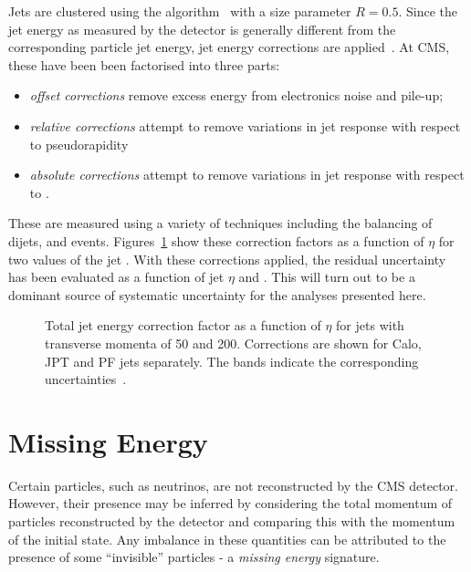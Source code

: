 Jets are clustered using the \antiKT algorithm~\cite{antiKT} with a size
parameter $R=0.5$. Since the jet energy as measured by the detector is generally
different from the corresponding particle jet energy, jet energy corrections are
applied~\cite{jet_energy_cms, jet_energy_pas}. At \ac{CMS}, these have been been
factorised into three parts:
\begin{itemize}
\item \emph{offset corrections} remove excess energy from electronics noise and
  pile-up;
\item \emph{relative corrections} attempt to remove variations in jet response
  with respect to pseudorapidity
\item \emph{absolute corrections} attempt to remove variations in jet response
  with respect to \Pt.
\end{itemize}
These are measured using a variety of techniques including the balancing of
dijets, \gammajets and \Zjets events. Figures~\ref{fig:reco_jet_energy_corr}
show these correction factors as a function of $\eta$ for two values of the jet
\Pt. With these corrections applied, the residual uncertainty has been evaluated
as a function of jet $\eta$ and \Pt. This will turn out to be a dominant source
of systematic uncertainty for the analyses presented here.

\begin{figure}
  \centering
  \quad
  \quad
  \caption[Total jet energy correction factor as a function of $\eta$ for jets
  with transverse momenta of \unit{50}{\GeV} and \unit{200}{\GeV}]{Total jet
    energy correction factor as a function of $\eta$ for jets with transverse
    momenta of \unit{50}{\GeV} and \unit{200}{\GeV}. Corrections are shown for
    \ac{Calo}, \ac{JPT} and \ac{PF} jets separately. The bands indicate the
    corresponding uncertainties~\cite{jet_energy_pas}.}
  \label{fig:reco_jet_energy_corr}
\end{figure}

\section{Missing Energy}
Certain particles, such as neutrinos, are not reconstructed by the \ac{CMS}
detector. However, their presence may be inferred by considering the total
momentum of particles reconstructed by the detector and comparing this with the
momentum of the initial state. Any imbalance in these quantities can be
attributed to the presence of some ``invisible'' particles - a \emph{missing
  energy} signature.

